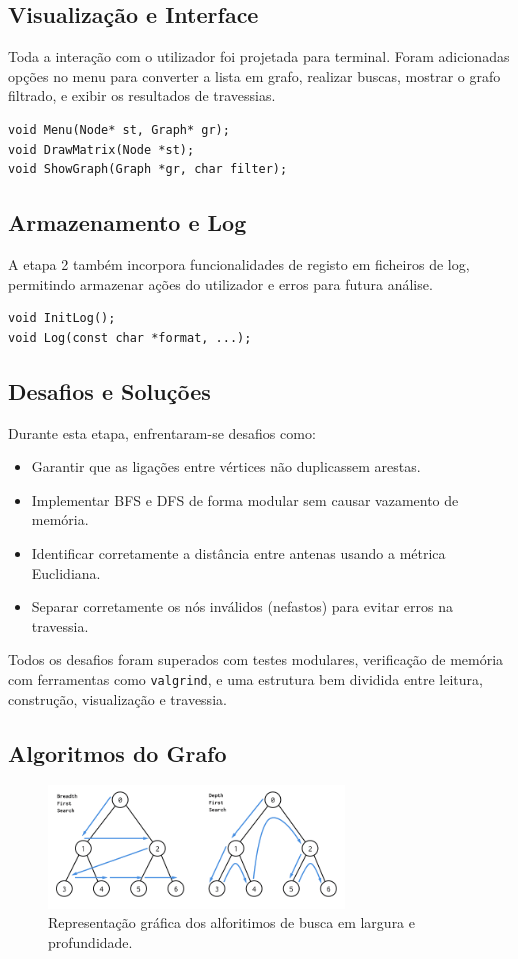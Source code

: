 \documentclass[a4paper,12pt]{article}
\begin{document}
\subsection{Visualização e Interface}
Toda a interação com o utilizador foi projetada para terminal. Foram adicionadas opções no menu para converter a lista em grafo, realizar buscas, mostrar o grafo filtrado, e exibir os resultados de travessias.

\begin{lstlisting}[style=CStyle]
void Menu(Node* st, Graph* gr);
void DrawMatrix(Node *st);
void ShowGraph(Graph *gr, char filter);
\end{lstlisting}

\subsection{Armazenamento e Log}
A etapa 2 também incorpora funcionalidades de registo em ficheiros de log, permitindo armazenar ações do utilizador e erros para futura análise.

\begin{lstlisting}[style=CStyle]
void InitLog();
void Log(const char *format, ...);
\end{lstlisting}

\subsection{Desafios e Soluções}
Durante esta etapa, enfrentaram-se desafios como:
\begin{itemize}
    \item Garantir que as ligações entre vértices não duplicassem arestas.
    \item Implementar BFS e DFS de forma modular sem causar vazamento de memória.
    \item Identificar corretamente a distância entre antenas usando a métrica Euclidiana.
    \item Separar corretamente os nós inválidos (nefastos) para evitar erros na travessia.
\end{itemize}

Todos os desafios foram superados com testes modulares, verificação de memória com ferramentas como \texttt{valgrind}, e uma estrutura bem dividida entre leitura, construção, visualização e travessia.

\subsection{Algoritmos do Grafo}
\begin{figure}[h!]
    \centering
    \includegraphics[width=0.7\textwidth]{grafo.png}
    \caption{Representação gráfica dos alforitimos de busca em largura e profundidade.}
\end{figure}
\newpage
\end{document}

